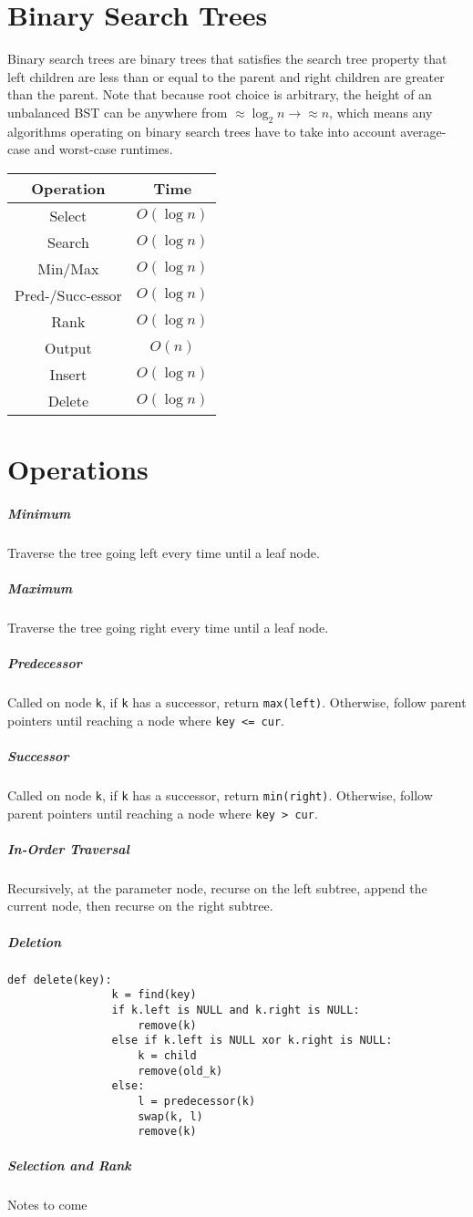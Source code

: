\documentclass[11pt]{article}
\begin{document}
\section{Binary Search Trees}
	Binary search trees are binary trees that satisfies the search tree property that left children are less than or equal to the parent and right children are greater than the parent. Note that because root choice is arbitrary, the height of an unbalanced BST can be anywhere from $\approx \log_2 n \rightarrow \approx n$, which means any algorithms operating on binary search trees have to take into account average-case and worst-case runtimes.

	\begin{tabular}{cc}
		Operation	&	Time\\\hline
		   Select	&	$O(\log n)$\\
		   Search	&	$O(\log n)$\\
		  Min/Max	&	$O(\log n)$\\
 Pred-/Succ-essor	&	$O(\log n)$\\
		   Rank		&	$O(\log n)$\\
		   Output	&	$O(n)$\\
		   Insert	&	$O(\log n)$\\
		   Delete	&	$O(\log n)$
	\end{tabular}

\section{Operations}
	\subparagraph{Minimum} Traverse the tree going left every time until a leaf node.
	\subparagraph{Maximum} Traverse the tree going right every time until a leaf node.
	\subparagraph{Predecessor} Called on node \verb|k|, if \verb|k| has a successor, return \verb|max(left)|. Otherwise, follow parent pointers until reaching a node where \verb|key <= cur|.
	\subparagraph{Successor} Called on node \verb|k|, if \verb|k| has a successor, return \verb|min(right)|. Otherwise, follow parent pointers until reaching a node where \verb|key > cur|.
	\subparagraph{In-Order Traversal} Recursively, at the parameter node, recurse on the left subtree, append the current node, then recurse on the right subtree.
	\subparagraph{Deletion}
		\begin{lstlisting}[autogobble=true]
			def delete(key):
				k = find(key)
				if k.left is NULL and k.right is NULL:
					remove(k)
				else if k.left is NULL xor k.right is NULL:
					k = child
					remove(old_k)
				else:
					l = predecessor(k)
					swap(k, l)
					remove(k)
		\end{lstlisting}
	\subparagraph{Selection and Rank} Notes to come
\end{document}
